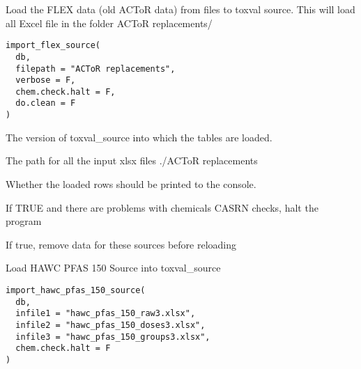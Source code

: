 \documentclass[letterpaper]{book}
\begin{document}
%
\begin{Description}\relax
Load the FLEX data (old ACToR data) from files to toxval source. This will load all
Excel file in the folder ACToR replacements/
\end{Description}
%
\begin{Usage}
\begin{verbatim}
import_flex_source(
  db,
  filepath = "ACToR replacements",
  verbose = F,
  chem.check.halt = F,
  do.clean = F
)
\end{verbatim}
\end{Usage}
%
\begin{Arguments}
\begin{ldescription}
\item[\code{db}] The version of toxval\_source into which the tables are loaded.

\item[\code{filepath}] The path for all the input xlsx files ./ACToR replacements

\item[\code{verbose}] Whether the loaded rows should be printed to the console.

\item[\code{chem.check.halt}] If TRUE and there are problems with chemicals CASRN checks, halt the program

\item[\code{do.clean}] If true, remove data for these sources before reloading
\end{ldescription}
\end{Arguments}
%
\begin{Description}\relax
Load HAWC PFAS 150 Source into toxval\_source
\end{Description}
%
\begin{Usage}
\begin{verbatim}
import_hawc_pfas_150_source(
  db,
  infile1 = "hawc_pfas_150_raw3.xlsx",
  infile2 = "hawc_pfas_150_doses3.xlsx",
  infile3 = "hawc_pfas_150_groups3.xlsx",
  chem.check.halt = F
)
\end{verbatim}
\end{Usage}
%
\end{document}
